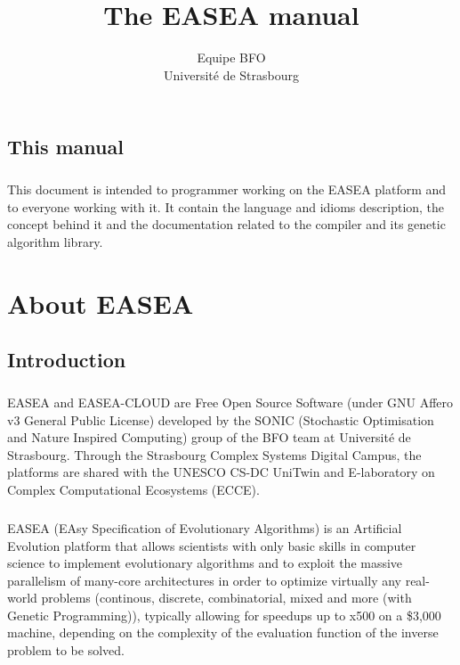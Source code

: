 \documentclass{book}
\begin{document}
\title{The EASEA manual}
\author{Equipe BFO \\
  \small Université de Strasbourg}
\maketitle


\setcounter{tocdepth}{3}
\tableofcontents
\section{This manual} %
\label{sec:introduction}
  \paragraph{} %
  \label{par:}

  This document is intended to programmer working on the EASEA platform and to
  everyone working with it. It contain the language and idioms description, the
  concept behind it and the documentation related to the compiler and its genetic
  algorithm library.
\chapter{About EASEA}
\section{Introduction} %
\label{sec:Introduction}
\paragraph{} %
\label{par:}

EASEA and EASEA-CLOUD are Free Open Source Software (under GNU Affero v3 General Public License) developed by the SONIC (Stochastic Optimisation and Nature Inspired Computing) group of the BFO team at Université de Strasbourg. Through the Strasbourg Complex Systems Digital Campus, the platforms are shared with the UNESCO CS-DC UniTwin and E-laboratory on Complex Computational Ecosystems (ECCE).
\paragraph{} %
\label{par:}
  
EASEA (EAsy Specification of Evolutionary Algorithms) is an Artificial Evolution
platform that allows scientists with only basic skills in computer science to
implement evolutionary algorithms and to exploit the massive parallelism of
many-core architectures in order to optimize virtually any real-world problems
(continous, discrete, combinatorial, mixed and more (with Genetic Programming)),
typically allowing for speedups up to x500 on a \$3,000 machine, depending on the complexity of the evaluation function of the inverse problem to be solved.
\end{document}
